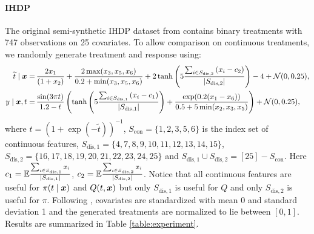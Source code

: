 \paragraph{IHDP}
The original semi-synthetic IHDP dataset from \cite{hill2011bayesian} contains binary treatments with 747 observations on 25 covariates. To allow comparison on continuous treatments, we randomly generate treatment and response using: 
\begin{align*}
\widetilde{t} \mid\boldsymbol{x}=&\,\frac{2x_{1}}{(1+x_{2})}+\frac{2\max(x_{3},x_{5},x_{6})}{0.2+\min(x_{3},x_{5},x_{6})}+2\tanh\left(5\frac{\sum_{i\in S_{\text{dis},2}}\left(x_{i}-c_{2}\right)}{\left|S_{\text{dis},2}\right|}\right)-4+\mathcal{N}(0,0.25),\\
y\mid\boldsymbol{x},t =&\,\frac{\sin(3\pi t)}{1.2-t}\left(\tanh\left(5\frac{\sum_{i\in S_{\text{dis},1}}\left(x_{i}-c_{1}\right)}{\left|S_{\text{dis},1}\right|}\right)+\frac{\exp(0.2(x_{1}-x_{6}))}{0.5+5\min(x_{2},x_{3},x_{5})}\right)+\mathcal{N}(0,0.25),
\end{align*}
where $t=(1+\exp(-\tilde t))^{-1}$,
$S_{\text{con}}=\{1,2,3,5,6\}$ is the index set of continuous
features, 
$
S_{\text{dis},1} =\{4,7,8,9,10,11,12,13,14,15\}$,
$S_{\text{dis},2} =\{16,17,18,19,20,21,22,23,24,25\}
$ and $S_{\text{dis},1}\cup S_{\text{dis},2}=[25]-S_{\text{con}}$.
Here $c_{1}=\mathbb{E}\frac{\sum_{i\in S_{\text{dis},1}}x_{i}}{\left|S_{\text{dis},1}\right|}$,
$c_{2}=\mathbb{E}\frac{\sum_{i\in S_{\text{dis},2}}x_{i}}{\left|S_{\text{dis},2}\right|}$.
Notice that all continuous features are useful for $\pi(t\mid\boldsymbol{x})$ and
$Q(t,\boldsymbol{x})$ but only $S_{\text{dis},1}$ is useful for $Q$ and
only $S_{\text{dis},2}$ is useful for $\pi$. 
Following \cite{hill2011bayesian}, covariates are standardized with mean 0 and standard deviation 1 and the generated treatments are normalized to lie between $[0,1]$. Results are summarized in Table \ref{table:experiment}.

